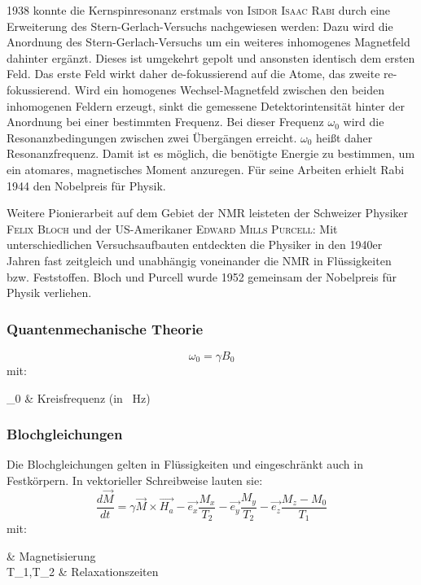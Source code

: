1938 konnte die Kernspinresonanz erstmals von \textsc{Isidor Isaac Rabi} durch eine Erweiterung des Stern-Gerlach-Versuchs nachgewiesen werden: Dazu wird die Anordnung des Stern-Gerlach-Versuchs um ein weiteres inhomogenes Magnetfeld dahinter ergänzt. Dieses ist umgekehrt gepolt und ansonsten identisch dem ersten Feld. Das erste Feld wirkt daher de-fokussierend auf die Atome, das zweite re-fokussierend. Wird ein homogenes Wechsel-Magnetfeld zwischen den beiden inhomogenen Feldern erzeugt, sinkt die gemessene Detektorintensität hinter der Anordnung bei einer bestimmten Frequenz. Bei dieser Frequenz $\omega_0$ wird die Resonanzbedingungen zwischen zwei Übergängen erreicht. $\omega_0$ heißt daher Resonanzfrequenz. Damit ist es möglich, die benötigte Energie zu bestimmen, um ein atomares, magnetisches Moment anzuregen. Für seine Arbeiten erhielt Rabi 1944 den Nobelpreis für Physik. \cite{Rabi1938}

Weitere Pionierarbeit auf dem Gebiet der NMR leisteten der Schweizer Physiker \textsc{Felix Bloch} und der US-Amerikaner \textsc{Edward Mills Purcell}: Mit unterschiedlichen Versuchsaufbauten entdeckten die Physiker in den 1940er Jahren fast zeitgleich und unabhängig voneinander die NMR in Flüssigkeiten bzw. Feststoffen. Bloch und Purcell wurde 1952 gemeinsam der Nobelpreis für Physik verliehen.


\subsubsection{Quantenmechanische Theorie}

\begin{equation}
	\omega_0=\gamma B_0
\end{equation}
mit:
\begin{with}
\omega_0 & Kreisfrequenz (in \SI{}{\hertz}) \\
\end{with}

\subsubsection{Blochgleichungen}
Die Blochgleichungen gelten in Flüssigkeiten und eingeschränkt auch in Festkörpern. In vektorieller Schreibweise lauten sie:
\begin{equation}
	\frac{d\vec{M}}{dt}=\gamma\vec{M}\times\vec{H_a}-\vec{e_x}\frac{M_x}{T_2}-\vec{e_y}\frac{M_y}{T_2}-\vec{e_z}\frac{M_z-M_0}{T_1}
\end{equation}
mit:
\begin{with*}
	 & Magnetisierung \\
	T_1,T_2 & Relaxationszeiten \\
\end{with*}


